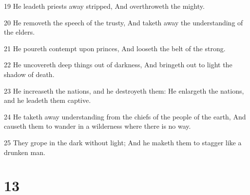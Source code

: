 \par 19 He leadeth priests away stripped, And overthroweth the mighty.
\par 20 He removeth the speech of the trusty, And taketh away the understanding of the elders.
\par 21 He poureth contempt upon princes, And looseth the belt of the strong.
\par 22 He uncovereth deep things out of darkness, And bringeth out to light the shadow of death.
\par 23 He increaseth the nations, and he destroyeth them: He enlargeth the nations, and he leadeth them captive.
\par 24 He taketh away understanding from the chiefs of the people of the earth, And causeth them to wander in a wilderness where there is no way.
\par 25 They grope in the dark without light; And he maketh them to stagger like a drunken man.

\chapter{13}


